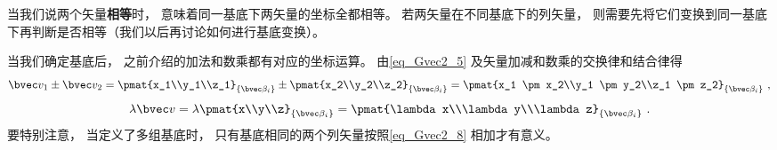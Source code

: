 当我们说两个矢量\textbf{相等}时， 意味着同一基底下两矢量的坐标全都相等。 若两矢量在不同基底下的列矢量， 则需要先将它们变换到同一基底下再判断是否相等（我们以后再讨论如何进行基底变换）。

当我们确定基底后， 之前介绍的加法和数乘都有对应的坐标运算。 由\autoref{eq_Gvec2_5} 及矢量加减和数乘的交换律和结合律得
\begin{equation}\label{eq_Gvec2_8}
\bvec v_1 \pm \bvec v_2 = \pmat{x_1\\y_1\\z_1}_{\{\bvec\beta_i\}} \pm \pmat{x_2\\y_2\\z_2}_{\{\bvec\beta_i\}} = \pmat{x_1 \pm x_2\\y_1 \pm y_2\\z_1 \pm z_2}_{\{\bvec\beta_i\}}~,
\end{equation}
\begin{equation}\label{eq_Gvec2_9}
\lambda \bvec v = \lambda\pmat{x\\y\\z}_{\{\bvec\beta_i\}} = \pmat{\lambda x\\\lambda y\\\lambda z}_{\{\bvec\beta_i\}}~.
\end{equation}
要特别注意， 当定义了多组基底时， 只有基底相同的两个列矢量按照\autoref{eq_Gvec2_8} 相加才有意义。
